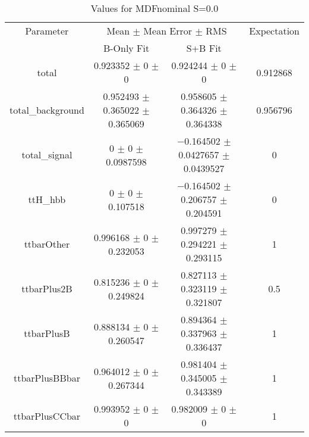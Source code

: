 \begin{table}
\centering
\caption{Values for MDFnominal S=0.0}
\begin{tabular}{cccc}
\toprule
Parameter & \multicolumn{2}{c}{Mean $\pm$ Mean Error $\pm$ RMS} & Expectation\\
 & B-Only Fit & S+B Fit & \\
\midrule
total & \num{0.923352} $\pm$ \num{0} $\pm$ \num{0} & \num{0.924244} $\pm$ \num{0} $\pm$ \num{0} & \num{0.912868}\\
total\_background & \num{0.952493} $\pm$ \num{0.365022} $\pm$ \num{0.365069} & \num{0.958605} $\pm$ \num{0.364326} $\pm$ \num{0.364338} & \num{0.956796}\\
total\_signal & \num{0} $\pm$ \num{0} $\pm$ \num{0.0987598} & \num{-0.164502} $\pm$ \num{0.0427657} $\pm$ \num{0.0439527} & \num{0}\\
ttH\_hbb & \num{0} $\pm$ \num{0} $\pm$ \num{0.107518} & \num{-0.164502} $\pm$ \num{0.206757} $\pm$ \num{0.204591} & \num{0}\\
ttbarOther & \num{0.996168} $\pm$ \num{0} $\pm$ \num{0.232053} & \num{0.997279} $\pm$ \num{0.294221} $\pm$ \num{0.293115} & \num{1}\\
ttbarPlus2B & \num{0.815236} $\pm$ \num{0} $\pm$ \num{0.249824} & \num{0.827113} $\pm$ \num{0.323119} $\pm$ \num{0.321807} & \num{0.5}\\
ttbarPlusB & \num{0.888134} $\pm$ \num{0} $\pm$ \num{0.260547} & \num{0.894364} $\pm$ \num{0.337963} $\pm$ \num{0.336437} & \num{1}\\
ttbarPlusBBbar & \num{0.964012} $\pm$ \num{0} $\pm$ \num{0.267344} & \num{0.981404} $\pm$ \num{0.345005} $\pm$ \num{0.343389} & \num{1}\\
ttbarPlusCCbar & \num{0.993952} $\pm$ \num{0} $\pm$ \num{0} & \num{0.982009} $\pm$ \num{0} $\pm$ \num{0} & \num{1}\\
\bottomrule
\end{tabular}
\end{table}